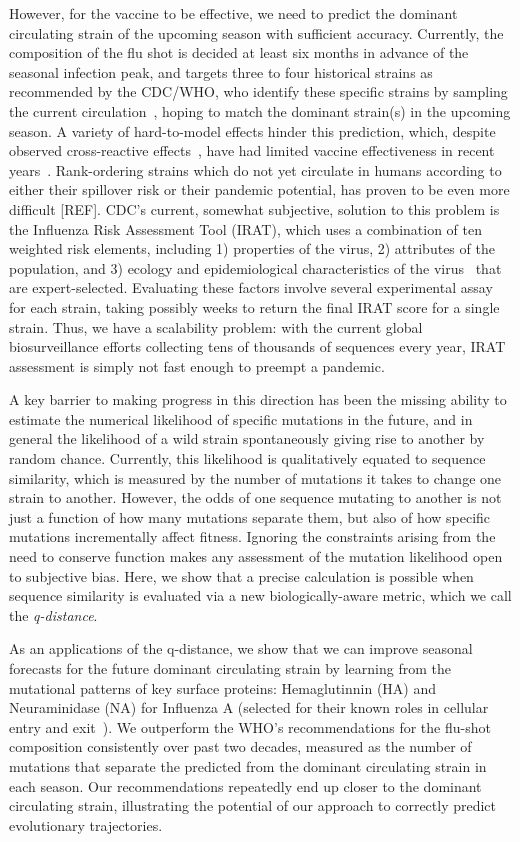 \documentclass[onecolumn, compsoc,10pt]{IEEEtran}
\begin{document}
However, for the  vaccine to be effective, we need to  predict the dominant circulating strain of the upcoming season with sufficient accuracy.
Currently, the composition of the flu shot is decided at least six months in advance of the seasonal infection peak, and targets three to four  historical strains as recommended by the CDC/WHO, who identify these specific strains by  sampling the current circulation~\cite{agor2018models}, hoping to match the  dominant strain(s) in the upcoming season. A variety of hard-to-model effects hinder this prediction, which, despite observed cross-reactive effects~\cite{tricco2013comparing}, have had  limited vaccine effectiveness in recent years~\cite{cdceff}. Rank-ordering strains which do not yet circulate in humans according to either their spillover risk or their pandemic potential, has proven to be even more difficult [REF]. CDC's current, somewhat subjective, solution to this problem is the Influenza Risk Assessment Tool (IRAT), which  uses a combination of ten weighted risk elements, including  1) properties of the virus, 2) attributes of the population, and 3) ecology and epidemiological characteristics of the virus~\cite{Influenz24:online} that are expert-selected. Evaluating these factors involve several experimental assay for each strain, taking possibly weeks to return the final IRAT  score for a single strain. Thus, we have a scalability problem: with  the current global biosurveillance efforts  collecting tens of thousands of sequences every year, IRAT assessment is simply not fast enough to  preempt a pandemic. 

A key barrier to making progress in this direction has been the missing ability to estimate the numerical likelihood of specific mutations in the future, and in general  the likelihood of a wild strain spontaneously giving rise to another by random chance. Currently, this likelihood is qualitatively equated to sequence similarity, which is measured by the number of mutations it takes to change one strain to another. However, the odds of one sequence mutating to another is not just a function of how many mutations separate them, but also of how specific mutations incrementally affect fitness. Ignoring the constraints arising from the need to conserve function makes any assessment of the mutation likelihood open to subjective bias. Here, we show that a precise calculation is possible when sequence similarity is evaluated via a new biologically-aware metric, which we call the \textit{q-distance}.

As an applications of the q-distance, we show that we can improve seasonal forecasts for the future dominant circulating strain by learning from the mutational patterns of key surface proteins: Hemaglutinnin (HA) and Neuraminidase (NA) for Influenza A (selected for their known roles in cellular entry and exit~\cite{gamblin2010influenza}). We outperform the WHO's recommendations for the flu-shot composition consistently over past two decades, measured as the number of mutations that separate the predicted from the dominant circulating strain in each season. Our recommendations repeatedly end up closer to the dominant circulating strain, illustrating the potential of our approach to correctly predict evolutionary trajectories. 
\end{document}
